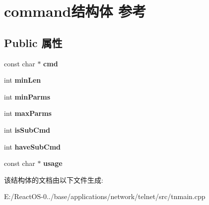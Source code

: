 \hypertarget{structcommand}{}\section{command结构体 参考}
\label{structcommand}
\subsection*{Public 属性}
\begin{DoxyCompactItemize}
\item 
\mbox{\label{structcommand_a015b6adf9e0a64721ae8340bd1a92ce8}} 
const char $\ast$ {\bfseries cmd}
\item 
\mbox{\label{structcommand_abc7bd6824c39a2aec994dc5521f11aba}} 
int {\bfseries min\+Len}
\item 
\mbox{\label{structcommand_a98142994251cdd727929bf3d648a503e}} 
int {\bfseries min\+Parms}
\item 
\mbox{\label{structcommand_aa450e5a1f5be37765017c1cde504f6d9}} 
int {\bfseries max\+Parms}
\item 
\mbox{\label{structcommand_a7982ec6732b75ae25540afcb68a73698}} 
int {\bfseries is\+Sub\+Cmd}
\item 
\mbox{\label{structcommand_a2b3283242edb499afd482ad4aa484cf9}} 
int {\bfseries have\+Sub\+Cmd}
\item 
\mbox{\label{structcommand_a364d65c5bae371cef4d83a1a580063d5}} 
const char $\ast$ {\bfseries usage}
\end{DoxyCompactItemize}


该结构体的文档由以下文件生成\+:\begin{DoxyCompactItemize}
\item 
E\+:/\+React\+O\+S-\/0../base/applications/network/telnet/src/tnmain.\+cpp\end{DoxyCompactItemize}
